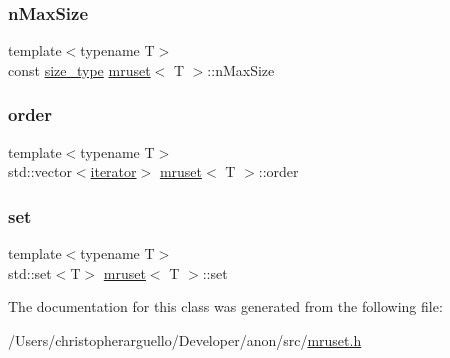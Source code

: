 \mbox{\label{classmruset_a96b4d730640dc1a78e5064eb1fab1c6d}} 
\subsubsection{\texorpdfstring{n\+Max\+Size}{nMaxSize}}
{\footnotesize\ttfamily template$<$typename T$>$ \\
const \mbox{\hyperlink{classmruset_aaee46af18d8a5bdc503e9570e499a335}{size\+\_\+type}} \mbox{\hyperlink{classmruset}{mruset}}$<$ T $>$\+::n\+Max\+Size\hspace{0.3cm}{\ttfamily [protected]}}

\mbox{\label{classmruset_a7e78b5feab9c1b3736ef4b8b75e9853d}} 
\subsubsection{\texorpdfstring{order}{order}}
{\footnotesize\ttfamily template$<$typename T$>$ \\
std\+::vector$<$\mbox{\hyperlink{classmruset_a246172eda1afff45be47a013c14b1ad6}{iterator}}$>$ \mbox{\hyperlink{classmruset}{mruset}}$<$ T $>$\+::order\hspace{0.3cm}{\ttfamily [protected]}}

\mbox{\label{classmruset_a4981fc3556b61600418b2ddad98cc685}} 
\subsubsection{\texorpdfstring{set}{set}}
{\footnotesize\ttfamily template$<$typename T$>$ \\
std\+::set$<$T$>$ \mbox{\hyperlink{classmruset}{mruset}}$<$ T $>$\+::set\hspace{0.3cm}{\ttfamily [protected]}}



The documentation for this class was generated from the following file\+:\begin{DoxyCompactItemize}
\item 
/\+Users/christopherarguello/\+Developer/anon/src/\mbox{\hyperlink{mruset_8h}{mruset.\+h}}\end{DoxyCompactItemize}
